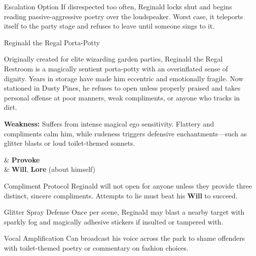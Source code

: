 \begin{CommentBox}{Escalation Option}
    If disrespected too often, Reginald locks shut and begins reading passive-aggressive poetry over the loudspeaker. Worst case, it teleports itself to the party stage and refuses to leave until someone sings to it.
\end{CommentBox}

\begin{NPC}[description={Sentient, Dramatic, Over-Enchanted}]{Reginald the Regal Porta-Potty}

    Originally created for elite wizarding garden parties, Reginald the Regal Restroom is a magically sentient porta-potty with an overinflated sense of dignity. Years in storage have made him eccentric and emotionally fragile. Now stationed in Dusty Pines, he refuses to open unless properly praised and takes personal offense at poor manners, weak compliments, or anyone who tracks in dirt.

    \textbf{Weakness:} Suffers from intense magical ego sensitivity. Flattery and compliments calm him, while rudeness triggers defensive enchantments—such as glitter blasts or loud toilet-themed sonnets.

    \vspace{0.5\baselineskip}
    \begin{SkillsBox}
        \Skilled & \textbf{Provoke} \\
        \Novice  & \textbf{Will}, \textbf{Lore} (about himself)
    \end{SkillsBox}

    \begin{TraitsBox}
        \item[Compliment Protocol] Reginald will not open for anyone unless they provide three distinct, sincere compliments. Attempts to lie must beat his \textbf{Will} to succeed.
        \item[Glitter Spray Defense] Once per scene, Reginald may blast a nearby target with sparkly fog and magically adhesive stickers if insulted or tampered with.
        \item[Vocal Amplification] Can broadcast his voice across the park to shame offenders with toilet-themed poetry or commentary on fashion choices.
    \end{TraitsBox}

    \DamageBox[%
        totalfatigue=3,%
        totalmild=3,totalmoderate=0,totalsevere=0,%
    ]
\end{NPC}


